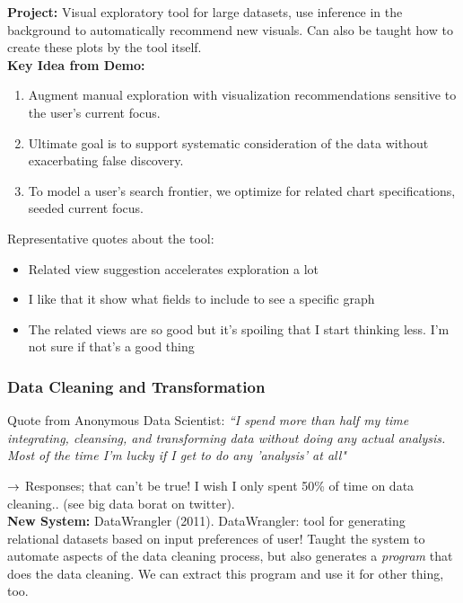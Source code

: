 {\bf Project:} Visual exploratory tool for large datasets, use inference in the background to automatically recommend new visuals. Can also be taught how to create these plots by the tool itself. \\

{\bf Key Idea from Demo:}
\begin{enumerate}
    \item Augment manual exploration with visualization recommendations sensitive to the user's current focus. 
    \item Ultimate goal is to support systematic consideration of the data without exacerbating false discovery.
    \item To model a user's search frontier, we optimize for related chart specifications, seeded current focus.
\end{enumerate} 
    

Representative quotes about the tool:
\begin{itemize}
\item Related view suggestion accelerates exploration a lot
\item I like that it show what fields to include to see a specific graph
\item The related views are so good but it's spoiling that I start thinking less. I'm not sure if that's a good thing
\end{itemize}

\subsubsection{Data Cleaning and Transformation}

Quote from Anonymous Data Scientist: {\it ``I spend more than half my time integrating, cleansing, and transforming data without doing any actual analysis. Most of the time I'm lucky if I get to do any 'analysis' at all"}

$\rightarrow$ Responses; that can't be true! I wish I only spent 50\% of time on data cleaning.. (see big data borat on twitter).\\

{\bf New System:} DataWrangler (2011). DataWrangler: tool for generating relational datasets based on input preferences of user! Taught the system to automate aspects of the data cleaning process, but also generates a {\it program} that does the data cleaning. We can extract this program and use it for other thing, too.\\

